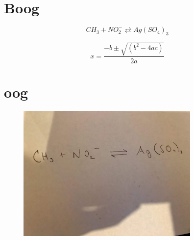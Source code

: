 \documentclass[a4paper, 12pt, titlepage, legno]{article}
\begin{document}
\tableofcontents

\newpage

\section{Boog}
\begin{equation}
C H_{3}+N O_{2}^{-} \rightleftarrows Ag\left(S O_{4}\right)_{3}
\end{equation}

\begin{equation}
x=\frac{-b \pm \sqrt{\left(b^{2}-4 a c\right)}}{2 a}
\end{equation}

\section{oog}
\begin{figure}[ht!]
\centering
\includegraphics[width=90mm]{../imgs/IMG_8641.jpg}

\end{figure}
\end{document}
